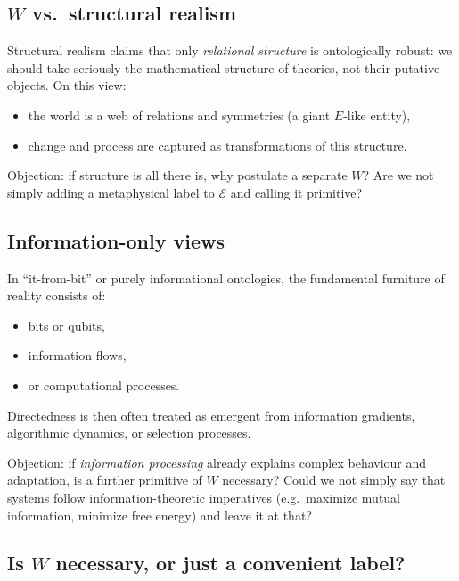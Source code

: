 \documentclass[12pt,a4paper]{report}
\newcommand{\Will}{W}
\begin{document}
\subsection*{\texorpdfstring{$W$}{W} vs.\ structural realism}

Structural realism claims that only \emph{relational structure} is ontologically robust: we should take seriously the mathematical structure of theories, not their putative objects. On this view:

\begin{itemize}[leftmargin=2em]
    \item the world is a web of relations and symmetries (a giant \(E\)-like entity),
    \item change and process are captured as transformations of this structure.
\end{itemize}

Objection: if structure is all there is, why postulate a separate \(\Will\)? Are we not simply adding a metaphysical label to \(\mathcal{E}\) and calling it primitive?

\subsection*{Information-only views}

In ``it-from-bit'' or purely informational ontologies, the fundamental furniture of reality consists of:

\begin{itemize}[leftmargin=2em]
    \item bits or qubits,
    \item information flows,
    \item or computational processes.
\end{itemize}

Directedness is then often treated as emergent from information gradients, algorithmic dynamics, or selection processes.

Objection: if \emph{information processing} already explains complex behaviour and adaptation, is a further primitive of \(\Will\) necessary? Could we not simply say that systems follow information-theoretic imperatives (e.g.\ maximize mutual information, minimize free energy) and leave it at that?

\subsection*{Is \texorpdfstring{$W$}{W} necessary, or just a convenient label?}
\end{document}
